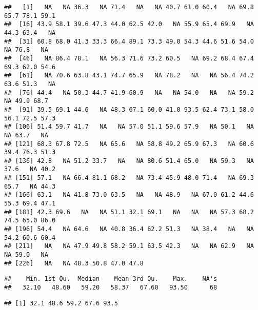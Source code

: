 \documentclass[
]{article}
\newenvironment{Shaded}{\begin{snugshade}}{\end{snugshade}}
\newcommand{\CommentTok}[1]{\textcolor[rgb]{0.56,0.35,0.01}{\textit{#1}}}
\newcommand{\DataTypeTok}[1]{\textcolor[rgb]{0.13,0.29,0.53}{#1}}
\newcommand{\KeywordTok}[1]{\textcolor[rgb]{0.13,0.29,0.53}{\textbf{#1}}}
\newcommand{\NormalTok}[1]{#1}
\newcommand{\OperatorTok}[1]{\textcolor[rgb]{0.81,0.36,0.00}{\textbf{#1}}}
\begin{document}
\begin{verbatim}
##   [1]   NA   NA 36.3   NA 71.4   NA   NA 40.7 61.0 60.4   NA 69.8 65.7 78.1 59.1
##  [16] 43.9 58.1 39.6 47.3 44.0 62.5 42.0   NA 55.9 65.4 69.9   NA 44.3 63.4   NA
##  [31] 60.8 68.0 41.3 33.3 66.4 89.1 73.3 49.0 54.3 44.6 51.6 54.0   NA 76.8   NA
##  [46]   NA 86.4 78.1   NA 56.3 71.6 73.2 60.5   NA 69.2 68.4 67.4 69.3 62.0 54.6
##  [61]   NA 70.6 63.8 43.1 74.7 65.9   NA 78.2   NA   NA 56.4 74.2 63.6 51.3   NA
##  [76] 44.4   NA 50.3 44.7 41.9 60.9   NA   NA 54.0   NA   NA 59.2   NA 49.9 68.7
##  [91] 39.5 69.1 44.6   NA 48.3 67.1 60.0 41.0 93.5 62.4 73.1 58.0 56.1 72.5 57.3
## [106] 51.4 59.7 41.7   NA   NA 57.0 51.1 59.6 57.9   NA 50.1   NA   NA 63.7   NA
## [121] 68.3 67.8 72.5   NA 65.6   NA 58.8 49.2 65.9 67.3   NA 60.6 39.4 76.3 51.3
## [136] 42.8   NA 51.2 33.7   NA   NA 80.6 51.4 65.0   NA 59.3   NA 37.6   NA 40.2
## [151] 57.1   NA 66.4 81.1 68.2   NA 73.4 45.9 48.0 71.4   NA 69.3 65.7   NA 44.3
## [166] 63.1   NA 41.8 73.0 63.5   NA   NA 48.9   NA 67.0 61.2 44.6 55.3 69.4 47.1
## [181] 42.3 69.6   NA   NA 51.1 32.1 69.1   NA   NA   NA 57.3 68.2 74.5 65.0 86.0
## [196] 54.4   NA 64.6   NA 40.8 36.4 62.2 51.3   NA 38.4   NA   NA 54.2 60.6 60.4
## [211]   NA   NA 47.9 49.8 58.2 59.1 63.5 42.3   NA   NA 62.9   NA   NA 59.0   NA
## [226]   NA   NA 48.3 50.8 47.0 47.8
\end{verbatim}

\begin{Shaded}
\end{Shaded}

\begin{verbatim}
##    Min. 1st Qu.  Median    Mean 3rd Qu.    Max.    NA's 
##   32.10   48.60   59.20   58.37   67.60   93.50      68
\end{verbatim}

\begin{Shaded}
\end{Shaded}

\begin{verbatim}
## [1] 32.1 48.6 59.2 67.6 93.5
\end{verbatim}
\end{document}
